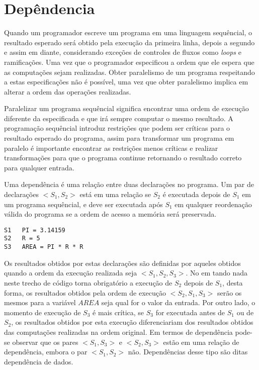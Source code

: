 
\chapter{Depêndencia}

Quando um programador escreve um programa em uma linguagem sequêncial, o
resultado esperado será obtido pela execução da primeira linha, depois a segundo
e assim em diante, considerando exceções de controles de fluxos como
\textit{loops} e ramificações. 
Uma vez que o programador especificou a ordem que ele espera que as computações 
sejam realizadas. 
Obter paralelismo de um programa respeitando a estas especificações não é
possível, uma vez que obter paralelismo implica em alterar a ordem das
operações realizadas.

Paralelizar um programa sequêncial significa encontrar uma ordem de execução
diferente da especificada e que irá sempre computar o mesmo resultado.
A programação sequêncial introduz restrições que podem ser críticas para o
resultado esperado do programa, assim para transformar um programa em paralelo é
importante encontrar as restrições menos críticas e realizar transformações para
que o programa continue retornando o resultado correto para qualquer entrada.


Uma dependência é uma relação entre duas declarações no programa. 
Um par de declarações $<S_1,S_2>$ está em uma relação se $S_2$ é executada 
depois de $S_1$ em um programa sequêncial, e deve ser executada após $S_1$ 
em qualquer reordenação válida do programa se a ordem de acesso a 
memória será preservada.

\begin{verbatim}
S1   PI = 3.14159
S2   R = 5 
S3   AREA = PI * R * R
\end{verbatim}

Os resultados obtidos por estas declarações são definidas por aqueles obtidos
quando a ordem da execução realizada seja $<S_1,S_2,S_3>$. 
No em tando nada neste trecho de código torna obrigatório a execução de 
$S_2$ depois de $S_1$, desta forma, os resultados obtidos pela ordem de execução 
$<S_2,S_1,S_3>$ serão os mesmos para a variável $AREA$ seja qual for o valor 
da entrada.
Por outro lado, o momento de execução de $S_3$ é mais crítica, se $S_3$ for
executada antes de $S_1$ ou de $S_2$, os resultados obtidos por esta execução
diferenciariam dos resultados obtidos das computações realizadas na ordem
original.
Em termos de dependência pode-se observar que os pares $<S_1,S_3>$ e $<S_2,S_3>$
estão em uma relação de dependência, embora o par $<S_1,S_2>$ não.
Dependências desse tipo são ditas dependência de dados.

